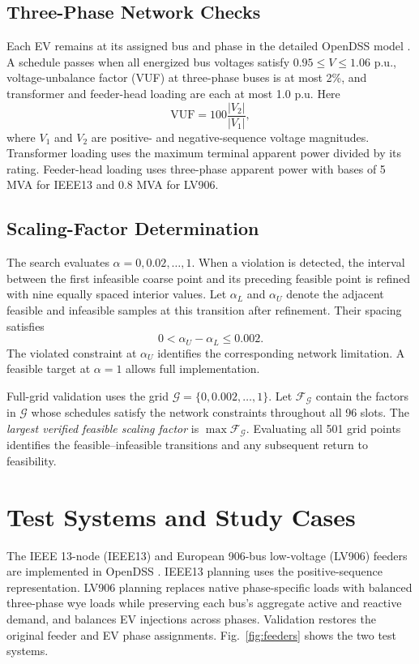 \documentclass[conference,letterpaper]{IEEEtran}
\begin{document}
\subsection{Three-Phase Network Checks}
Each EV remains at its assigned bus and phase in the detailed OpenDSS model \cite{opendss2020}. A schedule passes when all energized bus voltages satisfy $0.95\leq V\leq1.06$ p.u., voltage-unbalance factor (VUF) at three-phase buses is at most 2\%, and transformer and feeder-head loading are each at most 1.0 p.u. Here
\begin{equation}
\mathrm{VUF}=100\frac{|V_2|}{|V_1|},
\label{eq:vuf}
\end{equation}
where $V_1$ and $V_2$ are positive- and negative-sequence voltage magnitudes. Transformer loading uses the maximum terminal apparent power divided by its rating. Feeder-head loading uses three-phase apparent power with bases of 5 MVA for IEEE13 and 0.8 MVA for LV906.

\subsection{Scaling-Factor Determination}
The search evaluates $\alpha=0,0.02,\ldots,1$. When a violation is detected, the interval between the first infeasible coarse point and its preceding feasible point is refined with nine equally spaced interior values. Let $\alpha_L$ and $\alpha_U$ denote the adjacent feasible and infeasible samples at this transition after refinement. Their spacing satisfies
\begin{equation}
0<\alpha_U-\alpha_L\leq0.002.
\label{eq:bracket}
\end{equation}
The violated constraint at $\alpha_U$ identifies the corresponding network limitation. A feasible target at $\alpha=1$ allows full implementation.

Full-grid validation uses the grid $\mathcal G=\{0,0.002,\ldots,1\}$. Let $\mathcal F_{\mathcal G}$ contain the factors in $\mathcal G$ whose schedules satisfy the network constraints throughout all 96 slots. The \emph{largest verified feasible scaling factor} is $\max\mathcal F_{\mathcal G}$. Evaluating all 501 grid points identifies the feasible--infeasible transitions and any subsequent return to feasibility.

\section{Test Systems and Study Cases}
\label{sec:cases}
The IEEE 13-node (IEEE13) and European 906-bus low-voltage (LV906) feeders are implemented in OpenDSS \cite{dugan2009,ieeelv}. IEEE13 planning uses the positive-sequence representation. LV906 planning replaces native phase-specific loads with balanced three-phase wye loads while preserving each bus's aggregate active and reactive demand, and balances EV injections across phases. Validation restores the original feeder and EV phase assignments. Fig.~\ref{fig:feeders} shows the two test systems.
\end{document}
